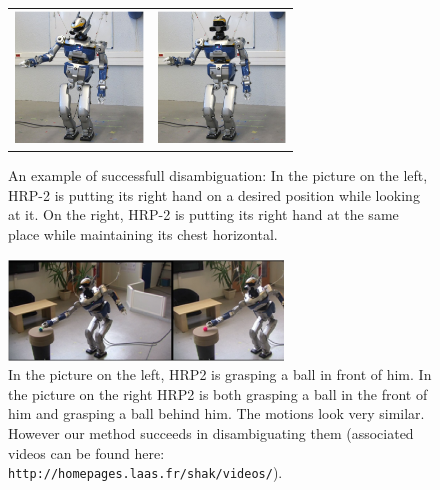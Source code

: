 \documentclass[a4paper]{article}
\begin{document}
\vfill
\begin{figure}[h]
  \centering
  \begin{tabular}{cc}
    \includegraphics[width=3.4cm]{img/realRobot/5a/5aFinal1.ps} &
    \includegraphics[width=3.4cm]{img/realRobot/5b/5bFinal1.ps} \\
  \end{tabular}
  \caption{An example of successfull disambiguation: In the picture on the left, HRP-2 is putting its right hand on a 
           desired position while looking at it. On the right, HRP-2 is putting its right hand at the same place while 
           maintaining its chest horizontal.}
  \label{fig:motion5}
\end{figure}
\vfill
\begin{figure}
  \centering
  \includegraphics[height=2.7cm]{img/spotDiff1H.ps}
  \caption{In the picture on the left, HRP2 is grasping a ball in front of him. In the picture on the right HRP2 is both grasping a ball in the front of him and grasping a ball behind him. The motions look very similar. However our method succeeds in disambiguating them (associated videos can be found here: \texttt{http://homepages.laas.fr/shak/videos/}).}
  \label{fig:introExample:graspFeet}
\end{figure}
\vfill
\end{document}
